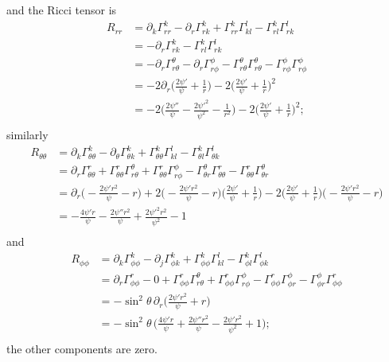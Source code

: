 \documentclass[12pt]{article}
\numberwithin{equation}{section}
\begin{document}
and the Ricci tensor is
\begin{equation}
\begin{aligned}
R_{rr} &= \partial_k \Gamma^k_{rr} - \partial_r \Gamma^k_{rk} + \Gamma^k_{rr} \Gamma^l_{kl} - \Gamma^k_{rl} \Gamma^l_{rk} \\
&= - \partial_r \Gamma^k_{rk} - \Gamma^k_{rl} \Gamma^l_{rk} \\
&= - \partial_r \Gamma^\theta_{r\theta} - \partial_r \Gamma^\phi_{r\phi} - \Gamma^\theta_{r\theta} \Gamma^\theta_{r\theta} - \Gamma^\phi_{r\phi} \Gamma^\phi_{r\phi} \\
&= - 2 \partial_r \Big( \frac{2 \psi'}{\psi}  + \frac{1}{r} \Big) - 2 \Big(\frac{2 \psi'}{\psi}  + \frac{1}{r}\Big)^2 \\
&= - 2 \Big( \frac{2 \psi''}{\psi} - \frac{2 \psi'^2}{\psi^2}  - \frac{1}{r^2} \Big) - 2 \Big(\frac{2 \psi'}{\psi}  + \frac{1}{r}\Big)^2; \\
\end{aligned}
\end{equation}
similarly
\begin{equation}
\begin{aligned}
R_{\theta \theta} &= \partial_k \Gamma^k_{\theta \theta} - \partial_\theta \Gamma^k_{\theta k} + \Gamma^k_{\theta \theta} \Gamma^l_{kl} - \Gamma^k_{\theta l} \Gamma^l_{\theta k} \\
&= \partial_r \Gamma^r_{\theta \theta} + \Gamma^r_{\theta \theta} \Gamma^\theta_{r\theta} + \Gamma^r_{\theta \theta} \Gamma^\phi_{r\phi} - \Gamma^\theta_{\theta r} \Gamma^r_{\theta \theta} - \Gamma^r_{\theta \theta} \Gamma^\theta_{\theta r} \\
&= \partial_r \Big( - \frac{2 \psi' r^2}{\psi} - r \Big) + 2 \Big(- \frac{2 \psi' r^2}{\psi} - r \Big) \Big( \frac{2 \psi'}{\psi}  + \frac{1}{r} \Big) - 2 \Big( \frac{2 \psi'}{\psi}  + \frac{1}{r} \Big) \Big( - \frac{2 \psi' r^2}{\psi} - r \Big) \\
&=  - \frac{4 \psi' r}{\psi} - \frac{2 \psi'' r^2}{\psi} + \frac{2 \psi'^2 r^2}{\psi^2} - 1 \\
\end{aligned}
\end{equation}
and
\begin{equation}
\begin{aligned}
R_{\phi \phi} &= \partial_k \Gamma^k_{\phi \phi} - \partial_j \Gamma^k_{\phi k} + \Gamma^k_{\phi \phi} \Gamma^l_{kl} - \Gamma^k_{\phi l} \Gamma^l_{\phi k} \\
&= \partial_r \Gamma^r_{\phi \phi} - 0 + \Gamma^r_{\phi \phi} \Gamma^\theta_{r \theta} + \Gamma^r_{\phi \phi} \Gamma^\phi_{r \phi} - \Gamma^r_{\phi \phi} \Gamma^\phi_{\phi r} - \Gamma^\phi_{\phi r} \Gamma^r_{\phi \phi}\\
&= - \sin^2 \theta \, \partial_r \Big( \frac{2 \psi' r^2}{\psi} + r \Big) \\
&= - \sin^2 \theta \, \Big( \frac{4 \psi' r}{\psi} + \frac{2 \psi'' r^2}{\psi} - \frac{2 \psi' r^2}{\psi^2} + 1 \Big); \\
\end{aligned}
\end{equation}
the other components are zero.
\end{document}
